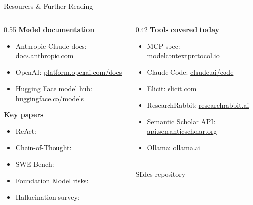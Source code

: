 \begin{frame}{Resources \& Further Reading}
  \begin{columns}[T, onlytextwidth]
    \begin{column}{0.55\textwidth}
      \textbf{Model documentation}\\[0.2em]
      \begin{itemize}
        \item Anthropic Claude docs: \href{https://docs.anthropic.com}{docs.anthropic.com}
        \item OpenAI: \href{https://platform.openai.com/docs}{platform.openai.com/docs}
        \item Hugging Face model hub: \href{https://huggingface.co/models}{huggingface.co/models}
      \end{itemize}
      \vspace{0.5em}
      \textbf{Key papers}\\[0.2em]
      \begin{itemize}
        \item ReAct: \parencite{yao2023react}
        \item Chain-of-Thought: \parencite{wei2022cot}
        \item SWE-Bench: \parencite{jimenez2024swebench}
        \item Foundation Model risks: \parencite{bommasani2021foundation}
        \item Hallucination survey: \parencite{huang2023hallucination}
      \end{itemize}
    \end{column}
    \hfill
    \begin{column}{0.42\textwidth}
      \textbf{Tools covered today}\\[0.2em]
      \begin{itemize}
        \item MCP spec: \href{https://modelcontextprotocol.io}{modelcontextprotocol.io}
        \item Claude Code: \href{https://claude.ai/code}{claude.ai/code}
        \item Elicit: \href{https://elicit.com}{elicit.com}
        \item ResearchRabbit: \href{https://www.researchrabbit.ai}{researchrabbit.ai}
        \item Semantic Scholar API: \href{https://api.semanticscholar.org}{api.semanticscholar.org}
        \item Ollama: \href{https://ollama.ai}{ollama.ai}
      \end{itemize}
      \vspace{0.4em}
      \centering
      \\
      \tiny Slides repository
    \end{column}
  \end{columns}
\end{frame}


